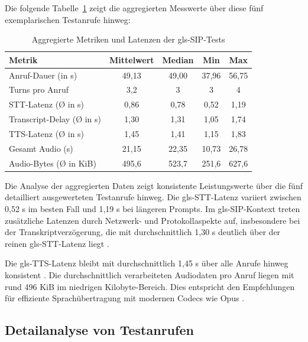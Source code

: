 Die folgende Tabelle~\ref{tab:sip-metriken-aggregiert} zeigt die aggregierten Messwerte über diese fünf exemplarischen Testanrufe hinweg:

\begin{table}[H]
  \centering
  \begin{tabular}{|l|c|c|c|c|}
    \hline
    \textbf{Metrik} & \textbf{Mittelwert} & \textbf{Median} & \textbf{Min} & \textbf{Max} \\ \hline
    Anruf-Dauer (in s) & 49,13 & 49,00 & 37,96 & 56,75 \\ \hline
    Turns pro Anruf & 3,2 & 3 & 3 & 4 \\ \hline
    STT-Latenz (Ø in s) & 0,86 & 0,78 & 0,52 & 1,19 \\ \hline
    Transcript-Delay (Ø in s) & 1,30 & 1,31 & 1,05 & 1,74 \\ \hline
    TTS-Latenz (Ø in s) & 1,45 & 1,41 & 1,15 & 1,83 \\ \hline
    Gesamt Audio (s) & 21,15 & 22,35 & 10,73 & 26,78 \\ \hline
    Audio-Bytes (Ø in KiB) & 495,6 & 523,7 & 251,6 & 627,6 \\ \hline
  \end{tabular}
  \caption{Aggregierte Metriken und Latenzen der \gls{gls-SIP}-Tests}
  \label{tab:sip-metriken-aggregiert}
\end{table}

Die Analyse der aggregierten Daten zeigt konsistente Leistungswerte über die fünf detailliert ausgewerteten Testanrufe hinweg. Die \gls{gls-STT}-Latenz variiert zwischen 0,52 s im besten Fall und 1,19 s bei längeren Prompts. Im \gls{gls-SIP}-Kontext treten zusätzliche Latenzen durch Netzwerk- und Protokollaspekte auf, insbesondere bei der Transkriptverzögerung, die mit durchschnittlich 1,30 s deutlich über der reinen \gls{gls-STT}-Latenz liegt \parencite{ITU-T-G114}.

Die \gls{gls-TTS}-Latenz bleibt mit durchschnittlich 1,45 s über alle Anrufe hinweg konsistent \parencite{openai_whisper_docs}. Die durchschnittlich verarbeiteten Audiodaten pro Anruf liegen mit rund 496 KiB im niedrigen Kilobyte-Bereich. Dies entspricht den Empfehlungen für effiziente Sprachübertragung mit modernen Codecs wie Opus \parencite{rfc6716}.

\subsection{Detailanalyse von Testanrufen}

